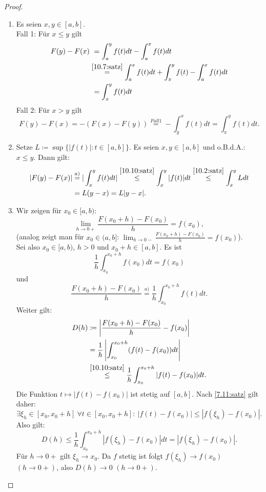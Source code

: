 \documentclass[12pt]{extreport} %
\theoremstyle{named}
\theoremstyle{itshape}
\theoremstyle{normal}
\begin{document}
{\begin{proof} ~\
	\begin{enumerate}
		\item Es seien $x, y \in [a, b]$. \\
		Fall 1: Für $x \leq y$ gilt
			\begin{align*}
				F(y) - F(x) & ~ = \int_{a}^{y} f(t) dt - \int_{a}^{x} f(t) dt \\
				& \overset{\ref{10.7:satz}}{=} \int_{a}^{x} f(t) dt + \int_{x}^{y} f(t) - \int_{a}^{x} f(t) dt \\
				& ~ = \int_{x}^{y} f(t) dt
			\end{align*}
			Fall 2: Für $x > y$ gilt
			$$ F(y) - F(x) = - (F(x) - F(y)) \overset{Fall 1}{=} - \int_{y}^{x} f(t) dt = \int_{x}^{y} f(t) dt. $$
		\item Setze $L \coloneqq \sup \{ |f(t)| : t \in [a, b] \}$. Es seien $x, y \in [a, b]$ und o.B.d.A.: $x \leq y$. Dann gilt:
			\begin{align*}
				|F(y) - F(x)| & \overset{a)}{=} | \int_{x}^{y} f(t) dt | \overset{\ref{10.10:satz}}{\leq} \int_{x}^{y} |f(t)| dt 
				\overset{\ref{10.2:satz}}{\leq} \int_{x}^{y} L dt \\
				& = L (y - x) = L |y - x|.
			\end{align*}
		\item Wir zeigen für $x_{0} \in [a, b)$:
			$$ \lim_{h \rightarrow 0+} \frac{F(x_{0} + h) - F(x_{0})}{h} = f(x_{0}), $$
			(analog zeigt man für $x_{0} \in (a, b]$: $\lim_{h \rightarrow 0 - } \frac{F(x_{0} + h) - F(x_{0})}{h} = f(x_{0})$). \\
			Sei also $x_{0} \in [a, b)$, $h > 0$ und $x_{0} + h \in [a, b]$. Es ist
			$$ \frac{1}{h} \int_{x_{0}}^{x_{0}+h} f(x_{0}) dt = f(x_{0}) $$
			und
			$$ \frac{F(x_{0} + h) - F(x_{0})}{h} \overset{a)}{=} \frac{1}{h} \int_{x_{0}}^{x_{0}+h} f(t) dt. $$
			Weiter gilt: 
			\begin{align*} 
				D(h) & \coloneqq \left| \frac{F(x_{0} + h) - F(x_{0})}{h} - f(x_{0}) \right| \\
					 & = \frac{1}{h} \left| \int_{x_{0}}^{x_{0}+h} ( f(t) - f(x_{0}) ) dt \right| \\
					 & \overset{\ref{10.10:satz}}{\leq} \frac{1}{h} \int_{x_{0}}^{x_{0}+h} | f(t) - f(x_{0})| dt. 
			\end{align*} 
			Die Funktion $t \mapsto |f(t) - f(x_{0})|$ ist stetig auf $[a,b]$. Nach \ref{7.11:satz} gilt daher:
			$$\exists \xi_{h} \in [x_{0}, x_{0} + h] ~\forall t \in [x_{0}, x_{0} + h]: ~  |f(t) - f(x_{0})| \leq | f(\xi_{h}) - f(x_{0})|.$$
			Also gilt: 
			$$ D(h) \leq \frac{1}{h} \int_{x_{0}}^{x_{0}+ h} |f(\xi_{h}) - f(x_{0})| dt = |f(\xi_{h}) - f(x_{0})|. $$ 
			Für $h \rightarrow 0+$ gilt $\xi_{h} \rightarrow x_{0}$. Da $f$ stetig ist folgt $f(\xi_{h}) \rightarrow f(x_{0})$ $(h \to 0+)$, 
			also $D(h) \rightarrow 0$ $(h \rightarrow 0+)$. 
	\end{enumerate}
\end{proof}


}
\end{document}
